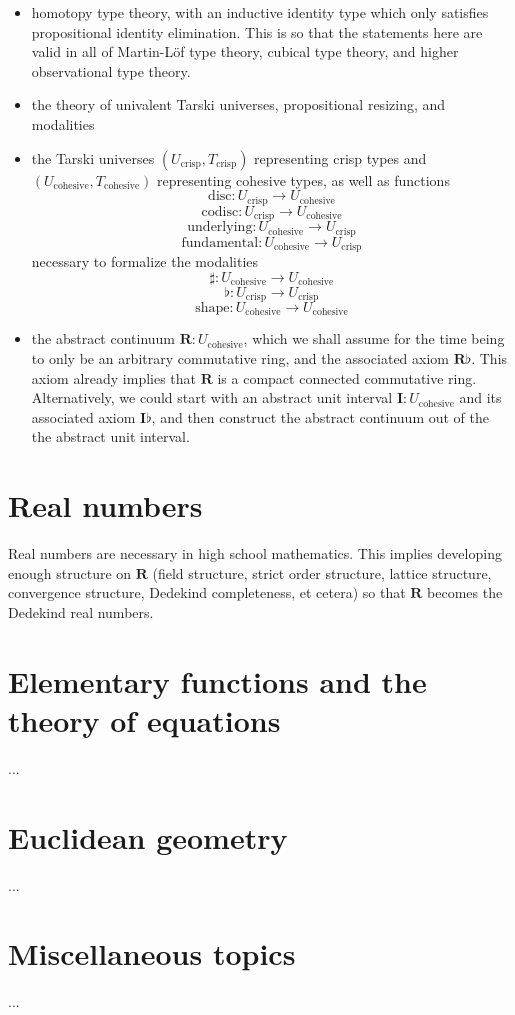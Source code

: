\documentclass[one]{article}
\begin{document}
\begin{itemize}
\item homotopy type theory, with an inductive identity type which only satisfies propositional identity elimination. This is so that the statements here are valid in all of Martin-Löf type theory, cubical type theory, and higher observational type theory. 

\item the theory of univalent Tarski universes, propositional resizing, and modalities

\item the Tarski universes $(U_\mathrm{crisp}, T_\mathrm{crisp})$ representing crisp types and $(U_\mathrm{cohesive}, T_\mathrm{cohesive})$ representing cohesive types, as well as functions 
$$\mathrm{disc}:U_\mathrm{crisp} \to U_\mathrm{cohesive}$$ 
$$\mathrm{codisc}:U_\mathrm{crisp} \to U_\mathrm{cohesive}$$
$$\mathrm{underlying}:U_\mathrm{cohesive} \to U_\mathrm{crisp}$$ 
$$\mathrm{fundamental}:U_\mathrm{cohesive} \to U_\mathrm{crisp}$$ 
necessary to formalize the modalities 
$$\sharp:U_\mathrm{cohesive} \to U_\mathrm{cohesive}$$
$$\flat:U_\mathrm{crisp} \to U_\mathrm{crisp}$$
$$\mathrm{shape}:U_\mathrm{cohesive} \to U_\mathrm{cohesive}$$

\item the abstract continuum $\mathbf{R}:U_\mathrm{cohesive}$, which we shall assume for the time being to only be an arbitrary commutative ring, and the associated axiom $\mathbf{R} \flat$. This axiom already implies that $\mathbf{R}$ is a compact connected commutative ring. Alternatively, we could start with an abstract unit interval $\mathbf{I}:U_\mathrm{cohesive}$ and its associated axiom $\mathbf{I} \flat$, and then construct the abstract continuum out of the the abstract unit interval. 
\end{itemize}

\section{Real numbers}

Real numbers are necessary in high school mathematics. This implies developing enough structure on $\mathbf{R}$ (field structure, strict order structure, lattice structure, convergence structure, Dedekind completeness, et cetera) so that $\mathbf{R}$ becomes the Dedekind real numbers. 

\section{Elementary functions and the theory of equations}

...

\section{Euclidean geometry}

...

\section{Miscellaneous topics}

...
\end{document}
